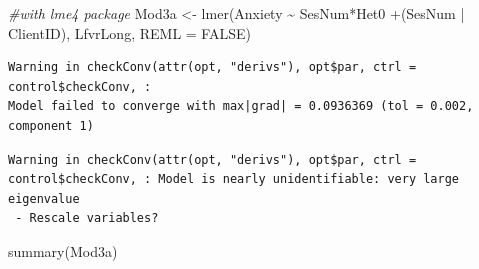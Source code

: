 \documentclass[
  11pt,
]{book}
\newenvironment{Shaded}{\begin{snugshade}}{\end{snugshade}}
\newcommand{\AttributeTok}[1]{\textcolor[rgb]{0.77,0.63,0.00}{#1}}
\newcommand{\CommentTok}[1]{\textcolor[rgb]{0.56,0.35,0.01}{\textit{#1}}}
\newcommand{\ConstantTok}[1]{\textcolor[rgb]{0.00,0.00,0.00}{#1}}
\newcommand{\FunctionTok}[1]{\textcolor[rgb]{0.00,0.00,0.00}{#1}}
\newcommand{\NormalTok}[1]{#1}
\newcommand{\OtherTok}[1]{\textcolor[rgb]{0.56,0.35,0.01}{#1}}
\newcommand{\SpecialCharTok}[1]{\textcolor[rgb]{0.00,0.00,0.00}{#1}}
\begin{document}
\begin{Shaded}
\begin{Highlighting}[]
\CommentTok{\#with lme4 package}
\NormalTok{Mod3a }\OtherTok{\textless{}{-}} \FunctionTok{lmer}\NormalTok{(Anxiety }\SpecialCharTok{\textasciitilde{}}\NormalTok{ SesNum}\SpecialCharTok{*}\NormalTok{Het0 }\SpecialCharTok{+}\NormalTok{(SesNum }\SpecialCharTok{|}\NormalTok{ ClientID), LfvrLong, }\AttributeTok{REML =} \ConstantTok{FALSE}\NormalTok{)}
\end{Highlighting}
\end{Shaded}

\begin{verbatim}
Warning in checkConv(attr(opt, "derivs"), opt$par, ctrl = control$checkConv, :
Model failed to converge with max|grad| = 0.0936369 (tol = 0.002, component 1)
\end{verbatim}

\begin{verbatim}
Warning in checkConv(attr(opt, "derivs"), opt$par, ctrl = control$checkConv, : Model is nearly unidentifiable: very large eigenvalue
 - Rescale variables?
\end{verbatim}

\begin{Shaded}
\begin{Highlighting}[]
\FunctionTok{summary}\NormalTok{(Mod3a)}
\end{Highlighting}
\end{Shaded}
\end{document}
